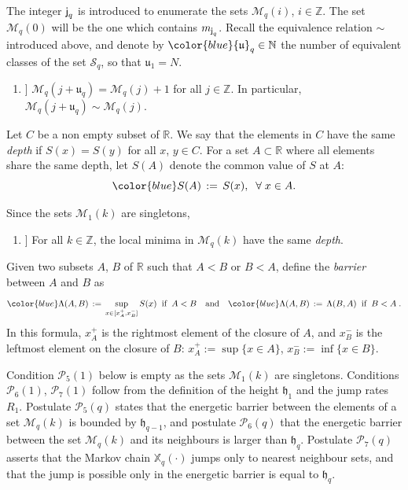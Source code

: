 \documentclass[reqno]{amsart}
\theoremstyle{plain}
\theoremstyle{definition}
\newcommand{\mc}[1]{{\mathcal #1}}
\newcommand{\mf}[1]{{\mathfrak #1}}
\newcommand{\bb}[1]{{\mathbb #1}}
\newcommand{\ms}[1]{{\mathscr #1}}
\newcommand{\mss}[1]{{\textsf #1}}
\newcounter{as}[section]
\newcommand{\<}{\langle}
\renewcommand{\>}{\rangle}
\begin{document}
The integer $\mss j_q$ is introduced to enumerate the sets
$\ms M_q(i)$, $i\in\bb Z$. The set $\ms M_q(0)$ will be the one which
contains $m_{\mss j_q}$.  Recall the equivalence relation $\sim$
introduced above, and denote by $\color{blue} \mf u_q\in \bb N$ the
number of equivalent classes of the set $\ms S_q$, so that
$\mf u_1=N$.

\begin{enumerate}

\item[[$\mc P_3(q)$\!\!\!]] 
$\ms M_q(j + \mf u_q) = \ms M_q(j) + 1$ for all $j\in \bb Z$.
In particular, $\ms M_q(j + \mf u_q) \sim \ms M_q(j)$.

\end{enumerate}

Let $C$ be a non empty subset of $\bb R$. We say that the elements in
$C$ have the same \emph{depth} if $S(x) = S(y)$ for all $x$,
$y \in C$. For a set $A\subset \bb R$ where all elements share the
same depth, let $S(A)$ denote the common value of $S$ at $A$:
\begin{equation}
\label{16}
{\color{blue} S(A)} \,:=\,  S(x),\;\; \forall\;x\in A.
\end{equation}

Since the sets $\ms M_{1}(k)$ are singletons,

\begin{enumerate}

\item[[$\mc P_4(q)$\!\!\!]] For all $k\in \bb Z$, the local minima in
$\ms M_{q}(k)$ have the same \emph{depth}.

\end{enumerate}

Given two subsets $A$, $B$ of $\bb R$ such that $A<B$ or $B<A$, define
the \emph{barrier} between $A$ and $B$ as
\begin{equation}
\label{09}
{\color{blue} \Lambda (A,B)}  \,:= \,
\sup_{x\in [x^{+}_{A}, x^{-}_{B}]}S(x)
\;\;\text{if}\;\;
A<B\quad\text{and}\quad 
{\color{blue}  \Lambda (A,B) }  \,:= \, \Lambda  (B,A)\;\;\text{if}\;\; B<A\;.
\end{equation}
In this formula, $x^{+}_{A}$ is the rightmost element of the closure of $A$, and
$x^{-}_{B}$ is the leftmost element on the closure of $B$:
$x^{+}_{A}:= \sup\{x\in A\}$, $x^{-}_{B}:= \inf\{x\in B\}$.

Condition $\mc P_5(1)$ below is empty as the sets $\ms M_{1}(k)$ are
singletons. Conditions $\mc P_6(1)$, $\mc P_7(1)$ follow from the
definition of the height $\mf h_1$ and the jump rates $R_1$.
Postulate $\mc P_5(q)$ states that the energetic barrier between the
elements of a set $\ms M_{q}(k)$ is bounded by $\mf h_{q-1}$, and
postulate $\mc P_6(q)$ that the energetic barrier between the set
$\ms M_{q}(k)$ and its neighbours is larger than $\mf h_q$. Postulate
$\mc P_7(q)$ asserts that the Markov chain $\bb X_q(\cdot)$ jumps only
to nearest neighbour sets, and that the jump is possible only in the
energetic barrier is equal to $\mf h_q$.
\end{document}
